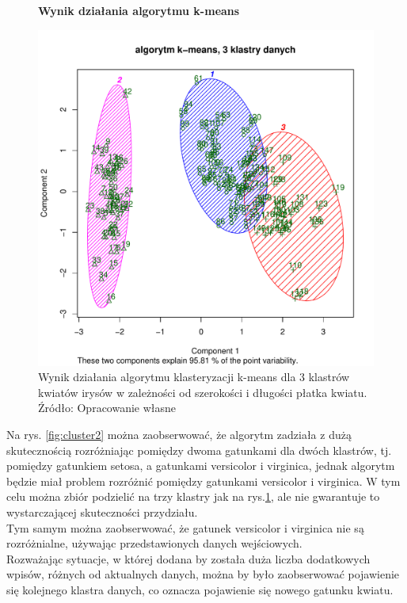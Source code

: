 \begin{figure}[h!]
    \centering
    \textbf{Wynik działania algorytmu k-means}\par\medskip
    \includegraphics[scale=0.4]{cluster3}
    \caption{Wynik działania algorytmu klasteryzacji k-means dla 3 klastrów kwiatów irysów w zależności od szerokości i 
długości płatka kwiatu. Źródło: Opracowanie własne}
    \label{fig:cluster3}
\end{figure}


Na rys. \ref{fig:cluster2} można zaobserwować, że algorytm zadziała z dużą skutecznością rozróżniając pomiędzy dwoma 
gatunkami dla dwóch klastrów, tj. pomiędzy gatunkiem setosa, a gatunkami versicolor i virginica, jednak algorytm będzie 
miał problem rozróżnić pomiędzy gatunkami versicolor i virginica.
W tym celu można zbiór podzielić na trzy klastry jak na rys.\ref{fig:cluster3}, ale nie gwarantuje to 
wystarczającej skuteczności przydziału. \\
Tym samym można zaobserwować, że gatunek versicolor i virginica nie są 
rozróżnialne, używając przedstawionych danych wejściowych.\\
Rozważając sytuacje, w której dodana by została duża liczba dodatkowych wpisów, różnych od aktualnych danych, 
można by było zaobserwować pojawienie się kolejnego klastra danych, co oznacza pojawienie się nowego gatunku kwiatu.


